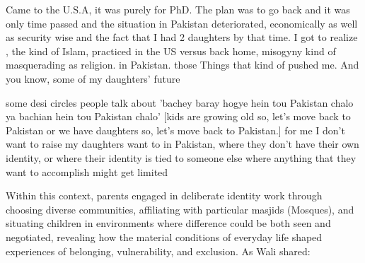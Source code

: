 \begin{FoundPoem}
Came to the U.S.A, it was purely for PhD. 
The plan was to go back and it was only
time passed and the 
situation in Pakistan deteriorated, 
economically as well as security wise and 
the fact that I had 2 daughters by that time.   I got to realize      , the kind of Islam, 
practiced in the US versus                back home,    
misogyny kind of masquerading as religion.              in Pakistan.   those   
 Things that kind of pushed me. And you know, 
some of my daughters’ future

some desi circles people talk about 
'bachey baray hogye hein tou Pakistan chalo  ya bachian hein tou Pakistan chalo' 
[kids are growing old so, let’s move back to Pakistan or we have daughters so, let’s move back to Pakistan.] 
 for me       
 I don’t want to raise my daughters  
want to in Pakistan, where they 
don't  have     their own identity, or   where 
their identity is tied                                           to someone            else 
where     anything that they want to accomplish might get limited
\end{FoundPoem}

Within this context, parents engaged in deliberate identity work through choosing diverse communities, affiliating with particular masjids (Mosques), and situating children in environments where difference could be both seen and negotiated, revealing how the material conditions of everyday life shaped experiences of belonging, vulnerability, and exclusion. As Wali shared:

